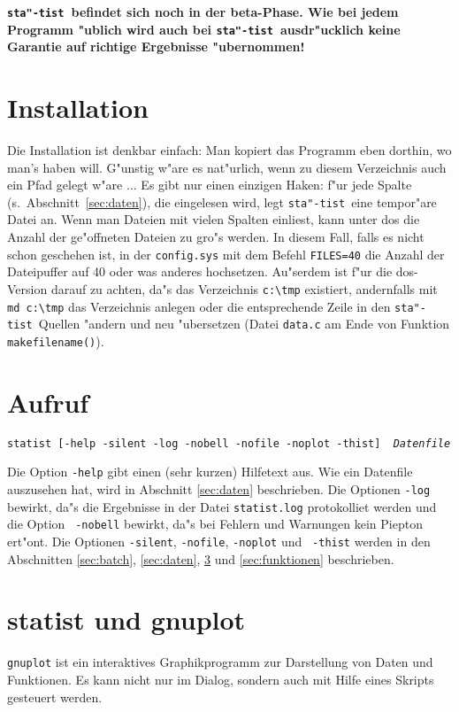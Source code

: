 \documentclass[a4paper,11pt]{article}
\newcommand{\st}{{\tt sta"-tist}}
\begin{document}
{\bf \st\ befindet sich noch in der beta-Phase. Wie bei jedem Programm
  "ublich wird auch bei \st\ ausdr"ucklich keine Garantie auf richtige
  Ergebnisse "ubernommen!}

\section{Installation}
\label{sec:installation}

Die Installation ist denkbar einfach: Man kopiert das Programm eben
dorthin, wo man's haben will. G"unstig w"are es nat"urlich, wenn zu
diesem Verzeichnis auch ein Pfad gelegt w"are $\ldots$ Es gibt nur
einen einzigen Haken: f"ur jede Spalte (s.\ 
Abschnitt~\ref{sec:daten}), die eingelesen wird, legt \st\ eine
tempor"are Datei an. Wenn man Dateien mit vielen Spalten einliest,
kann unter {\sc dos} die Anzahl der ge"offneten Dateien zu gro"s
werden. In diesem Fall, falls es nicht schon geschehen ist, in der
{\tt config.sys} mit dem Befehl {\tt FILES=40} die Anzahl der
Dateipuffer auf 40 oder was anderes hochsetzen. Au"serdem ist f"ur
die {\sc dos}-Version darauf zu achten, da"s das Verzeichnis 
\verb|c:\tmp| existiert, andernfalls mit \verb|md c:\tmp| das Verzeichnis
anlegen oder die entsprechende Zeile in den \st\ Quellen "andern und
neu "ubersetzen 
(Datei {\tt data.c} am Ende von Funktion {\tt makefilename()}).


\section{Aufruf}
{\tt statist [-help -silent -log -nobell -nofile -noplot -thist] {\em
    Datenfile}}
\par Die Option {\tt -help} gibt einen (sehr kurzen) Hilfetext aus.
Wie ein Datenfile auszusehen hat, wird in Abschnitt \ref{sec:daten}
beschrieben. Die Optionen {\tt -log} bewirkt, da"s die Ergebnisse in
der Datei {\tt statist.log} protokolliet werden und die Option {\tt
  -nobell} bewirkt, da"s bei Fehlern und Warnungen kein Piepton ert"ont.
Die Optionen {\tt -silent}, {\tt -nofile}, {\tt -noplot} und {\tt
  -thist} werden in den Abschnitten \ref{sec:batch}, \ref{sec:daten},
\ref{sec:gnuplot} und \ref{sec:funktionen} beschrieben.


\section{statist und gnuplot}
\label{sec:gnuplot}
{\tt gnuplot} ist ein interaktives Graphikprogramm zur Darstellung von
Daten und Funktionen. Es kann nicht nur im Dialog, sondern auch mit
Hilfe eines Skripts gesteuert werden.
\end{document}
